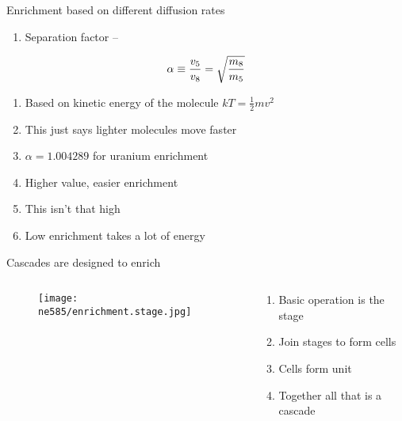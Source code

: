 \documentclass[aspectratio=1610,pdftex,dvipsnames,compress,xcolor={dvipsnames}]{beamer}
\begin{document}
\begin{frame}{Enrichment based on different diffusion rates}
    \begin{enumerate}[topsep=0pt,itemsep=18pt,leftmargin=*,label=(\arabic*)]
        \item[]Separation factor --
    \end{enumerate}

    \vspace*{\fill}

    \begin{equation}
        \LARGE
        \alpha \equiv \frac{v_5}{v_8} = \sqrt{\frac{m_8}{m_5}}
    \end{equation}
    
    \vspace*{\fill}

    \begin{enumerate}[topsep=0pt,itemsep=11pt,leftmargin=*,label=(\arabic*)]
        \item[]Based on kinetic energy of the molecule $kT = \frac{1}{2}mv^2$
        \item[]This just says lighter molecules move faster
        \item[]$\alpha = 1.004289$ for uranium enrichment
        \item[]Higher value, easier enrichment
        \item[]This isn't that high
        \item[]Low enrichment takes a lot of energy
    \end{enumerate}
\end{frame}


\begin{frame}{Cascades are designed to enrich}
    \begin{columns}

        \begin{column}{0.45\textwidth}
            \begin{figure}
                \centering
                \texttt{[image: ne585/enrichment.stage.jpg]}
            \end{figure}
        \end{column}

        \begin{column}{0.55\textwidth}
            \begin{enumerate}[series=outerlist,topsep=0pt,itemsep=21pt,leftmargin=*,label=(\arabic*)]
                \item[]Basic operation is the stage
                \item[]Join stages to form cells
                \item[]Cells form unit
                \item[]Together all that is a cascade
            \end{enumerate}
        \end{column}

    \end{columns}
\end{frame}
\end{document}
